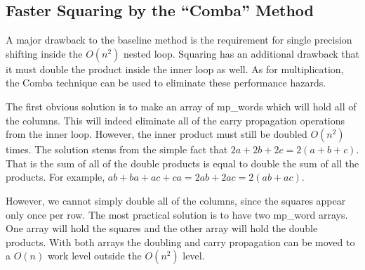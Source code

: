 \documentclass[b5paper]{book}
\begin{document}
\subsection{Faster Squaring by the ``Comba'' Method}
A major drawback to the baseline method is the requirement for single precision shifting inside the $O(n^2)$ nested loop.  Squaring has an additional
drawback that it must double the product inside the inner loop as well.  As for multiplication, the Comba technique can be used to eliminate these
performance hazards.

The first obvious solution is to make an array of mp\_words which will hold all of the columns.  This will indeed eliminate all of the carry
propagation operations from the inner loop.  However, the inner product must still be doubled $O(n^2)$ times.  The solution stems from the simple fact
that $2a + 2b + 2c = 2(a + b + c)$.  That is the sum of all of the double products is equal to double the sum of all the products.  For example,
$ab + ba + ac + ca = 2ab + 2ac = 2(ab + ac)$.  

However, we cannot simply double all of the columns, since the squares appear only once per row.  The most practical solution is to have two mp\_word
arrays.  One array will hold the squares and the other array will hold the double products.  With both arrays the doubling and carry propagation can be 
moved to a $O(n)$ work level outside the $O(n^2)$ level.  
\end{document}
